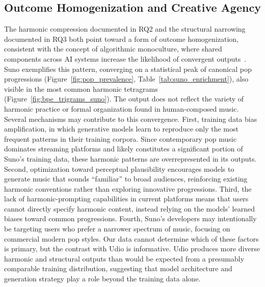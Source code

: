 \documentclass{article}
\begin{document}
\subsection{Outcome Homogenization and Creative Agency}
\label{sec:homogenization}
The harmonic compression documented in RQ2 and the structural narrowing documented in RQ3 both point toward a form of outcome homogenization, consistent with the concept of algorithmic monoculture, where shared components across AI systems increase the likelihood of convergent outputs~\citep{bommasani2022picking}. Suno exemplifies this pattern, converging on a statistical peak of canonical pop progressions (Figure~\ref{fig:pop_prevalence}, Table~\ref{tab:suno_enrichment}), also visible in the most common harmonic tetragrams (Figure~\ref{fig:bpe_trigrams_suno}). The output does not reflect the variety of harmonic practice or formal organization found in human-composed music.
Several mechanisms may contribute to this convergence. First, training data bias amplification, in which generative models learn to reproduce only the most frequent patterns in their training corpora. Since contemporary pop music dominates streaming platforms and likely constitutes a significant portion of Suno's training data, these harmonic patterns are overrepresented in its outputs. Second, optimization toward perceptual plausibility encourages models to generate music that sounds ``familiar'' to broad audiences, reinforcing existing harmonic conventions rather than exploring innovative progressions. Third, the lack of harmonic-prompting capabilities in current platforms means that users cannot directly specify harmonic content, instead relying on the models' learned biases toward common progressions. Fourth, Suno's developers may intentionally be targeting users who prefer a narrower spectrum of music, focusing on commercial modern pop styles.
Our data cannot determine which of these factors is primary, but the contrast with Udio is informative. Udio produces more diverse harmonic and structural outputs than would be expected from a presumably comparable training distribution, suggesting that model architecture and generation strategy play a role beyond the training data alone.
\end{document}
